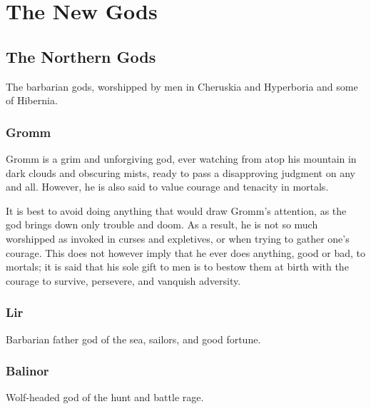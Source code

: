 \documentclass[a4paper]{style/dnd4e}
\begin{document}
\pagestyle{empty}

\newtoggle{DM}
\toggletrue{DM}




\section*{The New Gods}

\subsection*{The Northern Gods}
The barbarian gods, worshipped by men in Cheruskia and Hyperboria and some of Hibernia.


\subsubsection*{Gromm} 

Gromm is a grim and unforgiving god, ever watching 
from atop his mountain in dark clouds and obscuring mists, ready to 
pass a disapproving judgment on any and all. However, he is also 
said to value courage and tenacity in mortals.
  
It is best to avoid doing anything that would draw Gromm's attention,
as the god brings down only trouble and doom. As a result, he is 
not so much worshipped as invoked in curses and expletives, or when 
trying to gather one's courage. This does not however imply that he 
ever does anything, good or bad, to mortals; it is said that his 
sole gift to men is to bestow them at birth with the courage to 
survive, persevere, and vanquish adversity.


\subsubsection*{Lir}

Barbarian father god of the sea, sailors, and good fortune. 


\subsubsection*{Balinor}
Wolf-headed god of the hunt and battle rage. 
\end{document}
